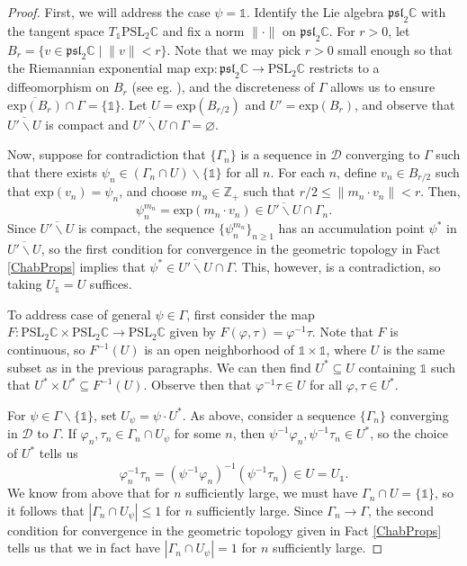 \documentclass[11pt,leqno]{article}
\theoremstyle{introdef}
\numberwithin{lemma}{section}
\theoremstyle{definition}
\newcommand{\Z}{\mathbb{Z}}
\newcommand{\C}{\mathbb{C}}
\begin{document}
\begin{proof}

    First, we will address the case $\psi=\mathds{1}$. Identify the Lie algebra $\mathfrak{psl}_2\C$ with the tangent space $T_{\mathds{1}}\mathrm{PSL}_2\C$ and fix a norm $\|\cdot\|$ on $\mathfrak{psl}_2\C$. For $r>0$, let $B_r=\{v\in\mathfrak{psl}_2\C\;|\;\|v\|<r\}$. Note that we may pick $r>0$ small enough so that the Riemannian exponential map $\mathrm{exp}:\mathfrak{psl}_2\C\rightarrow\mathrm{PSL}_2\C$ restricts to a diffeomorphism on $B_r$ (see eg. \cite{LEE}), and the discreteness of $\Gamma$ allows us to ensure $\overline{\mathrm{exp}(B_r)}\cap\Gamma=\{\mathds{1}\}$. Let $U=\mathrm{exp}(B_{r/2})$ and $U'=\mathrm{exp}(B_r)$, and observe that $\overline{U'\backslash U}$ is compact and $\overline{U'\backslash U}\cap\Gamma=\varnothing$.\par

    Now, suppose for contradiction that $\{\Gamma_n\}$ is a sequence in $\mathcal{D}$ converging to $\Gamma$ such that there exists $\psi_n\in(\Gamma_n\cap U)\backslash\{\mathds{1}\}$ for all $n$. For each $n$, define $v_n\in B_{r/2}$ such that $\mathrm{exp}(v_n)=\psi_n$, and choose $m_n\in\Z_+$ such that $r/2\leq\|m_n\cdot v_n\|<r$. Then, \[\psi_n^{m_n}=\mathrm{exp}(m_n\cdot v_n)\in\overline{U'\backslash U}\cap\Gamma_n.\] Since $\overline{U'\backslash U}$ is compact, the sequence $\{\psi_n^{m_n}\}_{n\geq1}$ has an accumulation point $\psi^*$ in $\overline{U'\backslash U}$, so the first condition for convergence in the geometric topology in Fact \ref{ChabProps} implies that $\psi^*\in\overline{U'\backslash U}\cap\Gamma$. This, however, is a contradiction, so taking $U_{\mathds{1}}=U$ suffices.\par

    To address case of general $\psi\in\Gamma$, first consider the map $F:\mathrm{PSL}_2\C\times\mathrm{PSL}_2\C\rightarrow\mathrm{PSL}_2\C$ given by $F(\varphi,\tau)=\varphi^{-1}\tau$. Note that $F$ is continuous, so $F^{-1}(U)$ is an open neighborhood of $\mathds{1}\times\mathds{1}$, where $U$ is the same subset as in the previous paragraphs. We can then find $U^*\subseteq U$ containing $\mathds{1}$ such that $U^*\times U^*\subseteq F^{-1}(U)$. Observe then that $\varphi^{-1}\tau\in U$ for all $\varphi,\tau\in U^*$. \par

    For $\psi\in\Gamma\backslash\{\mathds{1}\}$, set $U_\psi=\psi\cdot U^*$. As above, consider a sequence $\{\Gamma_n\}$ converging in $\mathcal{D}$ to $\Gamma$. If $\varphi_n,\tau_n\in\Gamma_n\cap U_\psi$ for some $n$, then $\psi^{-1}\varphi_n,\psi^{-1}\tau_n\in U^*$, so the choice of $U^*$ tells us \[\varphi_n^{-1}\tau_n=(\psi^{-1}\varphi_n)^{-1}(\psi^{-1}\tau_n)\in U=U_{\mathds{1}}.\] We know from above that for $n$ sufficiently large, we must have $\Gamma_n\cap U=\{\mathds{1}\}$, so it follows that $|\Gamma_n\cap U_\psi|\leq1$ for $n$ sufficiently large. Since $\Gamma_n\rightarrow\Gamma$, the second condition for convergence in the geometric topology given in Fact \ref{ChabProps} tells us that we in fact have $|\Gamma_n\cap U_\psi|=1$ for $n$ sufficiently large.
\end{proof}
\end{document}
